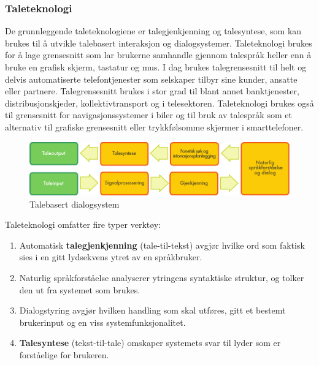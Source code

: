 \begin{multicols}{2}
\subsubsection{Taleteknologi}

De grunnleggende taleteknologiene er talegjenkjenning og talesyntese, som kan brukes til å utvikle talebasert interaksjon og dialogsystemer. Taleteknologi brukes for å lage grensesnitt som lar brukerne samhandle gjennom talespråk heller enn å bruke en grafisk skjerm, tastatur og mus. I dag brukes talegrensesnitt til helt og delvis automatiserte telefontjenester som selskaper tilbyr sine kunder, ansatte eller partnere. Talegrensesnitt brukes i stor grad til blant annet banktjenester, distribusjonskjeder, kollektivtransport og i telesektoren. Taleteknologi brukes også til grensesnitt for navigasjonssystemer i biler og til bruk av talespråk som et alternativ til grafiske grensesnitt eller trykkfølsomme skjermer i smarttelefoner.  

\begin{figure}[htb]
  \center
  \includegraphics[width=\textwidth]{../_media/norwegian-bokmaal/simple_speech-based_dialogue_architecture}
  \caption{Talebasert dialogsystem}
  \label{fig:dialoguearch_no}
\end{figure}

Taleteknologi omfatter fire typer verktøy: 

\begin{enumerate}
\item Automatisk \textbf{talegjenkjenning} (tale-til-tekst) avgjør hvilke ord som faktisk sies i en gitt lydsekvens ytret av en språkbruker.
\item Naturlig språkforståelse analyserer ytringens syntaktiske struktur, og tolker den ut fra systemet som brukes. 
\item Dialogstyring avgjør hvilken handling som skal utføres, gitt et bestemt brukerinput og en viss systemfunksjonalitet.
\item \textbf{Talesyntese} (tekst-til-tale) omskaper systemets svar til lyder som er forståelige for brukeren.
\end{enumerate}


\end{multicols}
